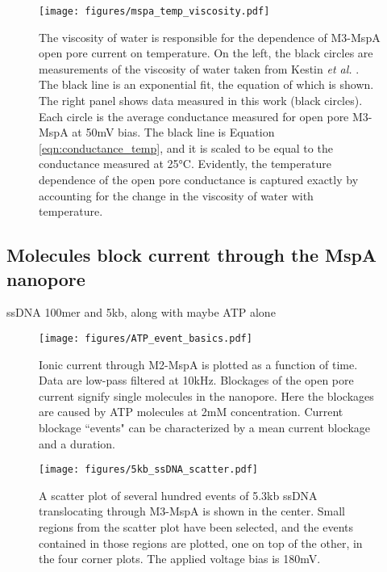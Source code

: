\begin{figure}[h]
\begin{centering}
\texttt{[image: figures/mspa\_temp\_viscosity.pdf]}
\caption[MspA current versus temperature explained by viscosity]{The viscosity of water is responsible for the dependence of M3-MspA open pore current on temperature.  On the left, the black circles are measurements of the viscosity of water taken from Kestin \textit{et al.} \cite{Kestin1978}.  The black line is an exponential fit, the equation of which is shown.  The right panel shows data measured in this work (black circles).  Each circle is the average conductance measured for open pore M3-MspA at 50mV bias.  The black line is Equation \ref{eqn:conductance_temp}, and it is scaled to be equal to the conductance measured at 25°C.  Evidently, the temperature dependence of the open pore conductance is captured exactly by accounting for the change in the viscosity of water with temperature.}
\label{fig:mspa_current_temp_viscosity}
\end{centering}
\end{figure}

\subsection{Molecules block current through the MspA nanopore}

ssDNA 100mer and 5kb, along with maybe ATP alone

\begin{figure}[h]
\begin{centering}
\texttt{[image: figures/ATP\_event\_basics.pdf]}
\caption[Current blockage events in the MspA nanopore]{Ionic current through M2-MspA is plotted as a function of time.  Data are low-pass filtered at 10kHz.  Blockages of the open pore current signify single molecules in the nanopore.  Here the blockages are caused by ATP molecules at 2mM concentration.  Current blockage ``events" can be characterized by a mean current blockage and a duration.}
\label{fig:mspa_event_basics}
\end{centering}
\end{figure}

\begin{figure}[h]
\begin{centering}
\texttt{[image: figures/5kb\_ssDNA\_scatter.pdf]}
\caption[Scatter plot of 5.3kb ssDNA in MspA]{A scatter plot of several hundred events of 5.3kb ssDNA translocating through M3-MspA is shown in the center.  Small regions from the scatter plot have been selected, and the events contained in those regions are plotted, one on top of the other, in the four corner plots.  The applied voltage bias is 180mV.}
\label{fig:mspa_5kb_scatter}
\end{centering}
\end{figure}

